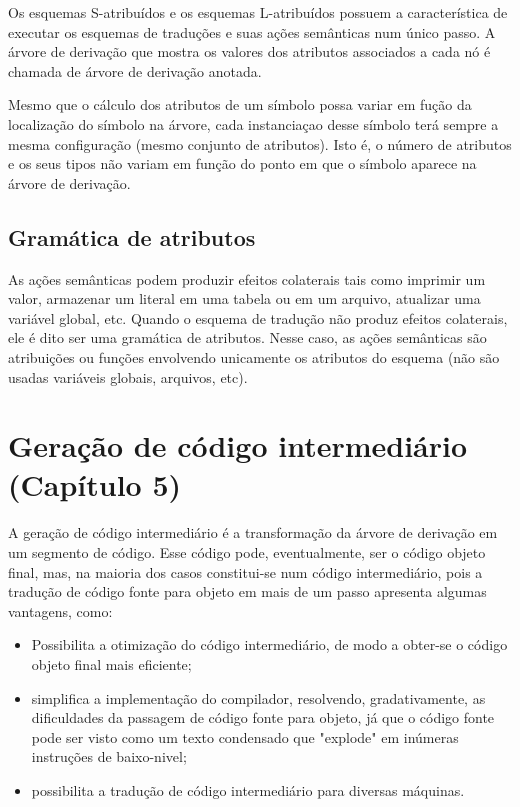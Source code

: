 \documentclass[11pt]{article}
\begin{document}
Os esquemas S-atribuídos e os esquemas L-atribuídos possuem a
característica de executar os esquemas de traduções e suas ações
semânticas num único passo. A árvore de derivação que mostra os
valores dos atributos associados a cada nó é chamada de árvore de
derivação anotada.

Mesmo que o cálculo dos atributos de um símbolo possa variar em
fução da localização do símbolo na árvore, cada instanciaçao desse
símbolo terá sempre a mesma configuração (mesmo conjunto de
atributos). Isto é, o número de atributos e os seus tipos não
variam em função do ponto em que o símbolo aparece na árvore de
derivação.

\subsection{Gramática de atributos}
\label{sec:org31d72c2}
As ações semânticas podem produzir efeitos colaterais tais como
imprimir um valor, armazenar um literal em uma tabela ou em um
arquivo, atualizar uma variável global, etc. Quando o esquema de
tradução não produz efeitos colaterais, ele é dito ser uma
gramática de atributos. Nesse caso, as ações semânticas são
atribuições ou funções envolvendo unicamente os atributos do
esquema (não são usadas variáveis globais, arquivos, etc).

\section{Geração de código intermediário (Capítulo 5)}
\label{sec:org882e870}
A geração de código intermediário é a transformação da árvore de
derivação em um segmento de código. Esse código pode, eventualmente,
ser o código objeto final, mas, na maioria dos casos constitui-se
num código intermediário, pois a tradução de código fonte para
objeto em mais de um passo apresenta algumas vantagens, como:

\begin{itemize}
\item Possibilita a otimização do código intermediário, de modo a
obter-se o código objeto final mais eficiente;
\item simplifica a implementação do compilador, resolvendo,
gradativamente, as dificuldades da passagem de código fonte para
objeto, já que o código fonte pode ser visto como um texto
condensado que "explode" em inúmeras instruções de baixo-nivel;
\item possibilita a tradução de código intermediário para diversas
máquinas.
\end{itemize}
\end{document}
